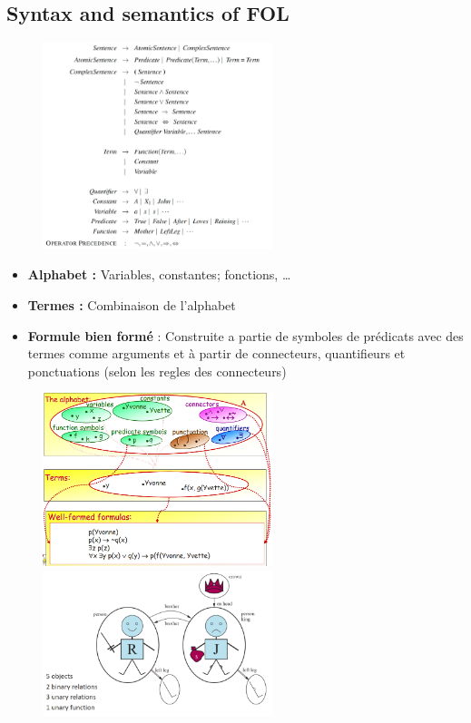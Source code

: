 	\subsection{Syntax and semantics of FOL}
		\begin{figure}[htp]	
			\centering
			\includegraphics[width=0.6\textwidth]{img/FOL.png}
		\end{figure}
		\begin{itemize}
			\item \textbf{Alphabet :} Variables, constantes; fonctions, \dots
			\item \textbf{Termes :} Combinaison de l'alphabet
			\item \textbf{Formule bien formé} : Construite a partie de symboles de prédicats avec des termes comme arguments et à partir de connecteurs, quantifieurs et ponctuations (selon les regles des connecteurs)
		\end{itemize}
		
		\begin{figure}[htp]	
			\centering
			\includegraphics[width=0.6\textwidth]{img/FOL1.png}
			\includegraphics[width=0.6\textwidth]{img/FOL2.png}

		\end{figure}
		
